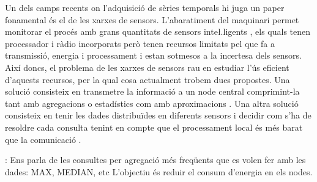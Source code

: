 Un dels camps recents on l'adquisició de sèries temporals hi juga un
paper fonamental és el de les xarxes de sensors. L'abaratiment del
maquinari permet monitorar el procés amb grans quantitats de sensors
inte\l.ligents \parencite{jainagrawal05,yaogehrke02}, els quals tenen
processador i ràdio incorporats però tenen recursos limitats pel que
fa a transmissió, energia i processament i estan sotmesos a la
incertesa dels sensors. Així doncs, el problema de les xarxes de
sensors rau en estudiar l'ús eficient d'aquests recursos, per la qual
cosa actualment trobem dues propostes.  Una solució consisteix en
transmetre la informació a un node central comprimint-la tant amb
agregacions o estadístics com amb
aproximacions \parencite{deligiannakis07}.  Una altra solució
consisteix en tenir les dades distribuïdes en diferents sensors i
decidir com s'ha de resoldre cada consulta tenint en compte que el
processament local és més barat que la
comunicació \parencite{yaogehrke02,gehrkemadden04,bonnet01,kim12:aggregate_sensor_networks}.



:
Ens parla de les consultes per agregació més freqüents que es volen fer amb les dades: MAX, MEDIAN, etc L'objectiu és reduir el consum d'energia en els nodes.
